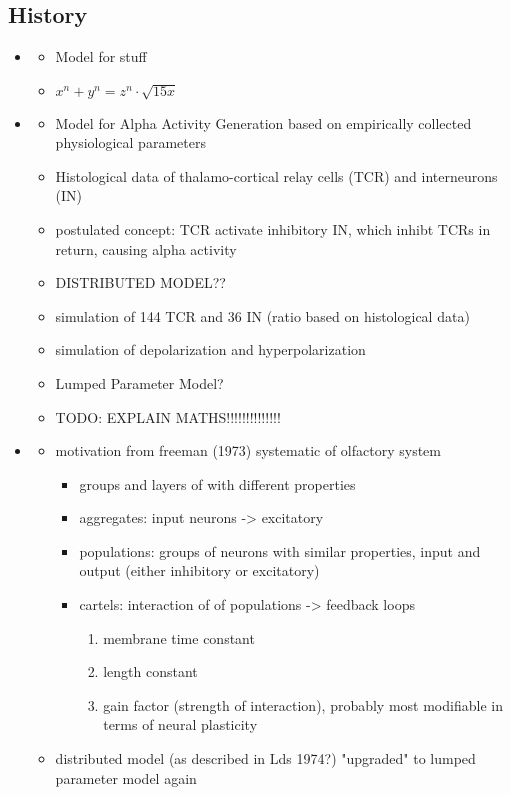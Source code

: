 \subsection{History}

\begin{itemize}
	\item \parencite{wilson_excitatory_1972}
	\begin{itemize}
		\item Model for stuff
		\item \( x^n + y^n = z^n \cdot \sqrt{15x} \)
	\end{itemize}
	\item \parencite{lopes_da_silva_model_1974}
	\begin{itemize}
		\item Model for Alpha Activity Generation based on empirically collected physiological parameters 
		\item Histological data of thalamo-cortical relay cells (TCR) and interneurons (IN)
		\item postulated concept: TCR activate inhibitory IN, which inhibt TCRs in return, causing alpha activity
		\item DISTRIBUTED MODEL??
		\item simulation of 144 TCR and 36 IN (ratio based on histological data)
		\item simulation of depolarization and hyperpolarization
		\item Lumped Parameter Model?
		\item TODO: EXPLAIN MATHS!!!!!!!!!!!!!!
	\end{itemize}
	
	\item \parencite{lopes_da_silva_models_1976}
	\begin{itemize}
		\item motivation from freeman (1973) systematic of olfactory system
		\begin{itemize}
			\item groups and layers of with different properties
			\item aggregates: input neurons -> excitatory
			\item populations: groups of neurons with similar properties, input and output (either inhibitory or excitatory)
			\item cartels: interaction of of populations -> feedback loops
			\begin{enumerate}
				\item membrane time constant
				\item length constant
				\item gain factor (strength of interaction), probably most modifiable in terms of neural plasticity
			\end{enumerate}
		\end{itemize}
		\item distributed model (as described in Lds 1974?) "upgraded" to lumped parameter model again
		\
	\end{itemize}
\end{itemize}

